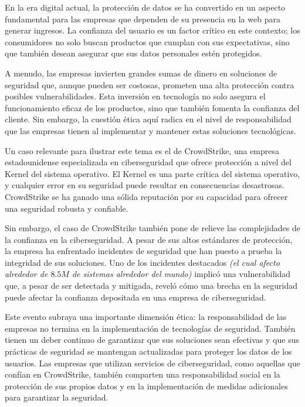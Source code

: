 \documentclass[letterpaper, 12pt]{report}
\begin{document}
En la era digital actual, la protección de datos se ha convertido en un aspecto
fundamental para las empresas que dependen de su presencia en la web para
generar ingresos. La confianza del usuario es un factor crítico en este
contexto; los consumidores no solo buscan productos que cumplan con sus
expectativas, sino que también desean asegurar que sus datos personales estén
protegidos.

A menudo, las empresas invierten grandes sumas de dinero en soluciones de
seguridad que, aunque pueden ser costosas, prometen una alta protección contra
posibles vulnerabilidades. Esta inversión en tecnología no solo asegura el
funcionamiento eficaz de los productos, sino que también fomenta la confianza
del cliente. Sin embargo, la cuestión ética aquí radica en el nivel de
responsabilidad que las empresas tienen al implementar y mantener estas
soluciones tecnológicas.

Un caso relevante para ilustrar este tema es el de CrowdStrike, una empresa
estadounidense especializada en ciberseguridad que ofrece protección a nivel
del Kernel del sistema operativo. El Kernel es una parte crítica del sistema
operativo, y cualquier error en su seguridad puede resultar en consecuencias
desastrosas. CrowdStrike se ha ganado una sólida reputación por su capacidad
para ofrecer una seguridad robusta y confiable.

Sin embargo, el caso de CrowdStrike también pone de relieve las complejidades
de la confianza en la ciberseguridad. A pesar de sus altos estándares de
protección, la empresa ha enfrentado incidentes de seguridad que han puesto a
prueba la integridad de sus soluciones. Uno de los incidentes destacados
\textit{(el cual afecto alrededor de $8.5M$ de sistemas alrededor del mundo)}
implicó una vulnerabilidad que, a pesar de ser detectada y mitigada, reveló
cómo una brecha en la seguridad puede afectar la confianza depositada en una
empresa de ciberseguridad.

Este evento subraya una importante dimensión ética: la responsabilidad de las
empresas no termina en la implementación de tecnologías de seguridad. También
tienen un deber continuo de garantizar que sus soluciones sean efectivas y que
sus prácticas de seguridad se mantengan actualizadas para proteger los datos de
los usuarios. Las empresas que utilizan servicios de ciberseguridad, como
aquellas que confían en CrowdStrike, también comparten una responsabilidad
social en la protección de sus propios datos y en la implementación de medidas
adicionales para garantizar la seguridad.
\end{document}
